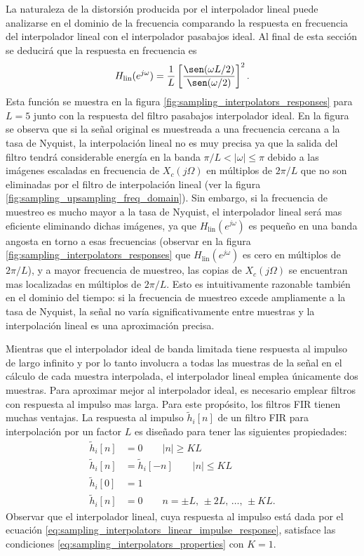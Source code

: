 \documentclass[a4paper]{report}
\begin{document}
La naturaleza de la distorsión producida por el interpolador lineal puede analizarse en el dominio de la frecuencia comparando la respuesta en frecuencia del interpolador lineal con el interpolador pasabajos ideal. Al final de esta sección se deducirá que la respuesta en frecuencia es
\begin{equation}\label{eq:sampling_interpolators_linear_freq_response}
 H_\textrm{lin}(e^{j\omega})=\frac{1}{L}\left[\frac{\sen(\omega L/2)}{\sen(\omega/2)}\right]^2.
\end{equation}
Esta función se muestra en la figura \ref{fig:sampling_interpolators_responses} para \(L=5\) junto con la respuesta del filtro pasabajos interpolador ideal. En la figura se observa que si la señal original es muestreada a una frecuencia cercana a la tasa de Nyquist, la interpolación lineal no es muy precisa ya que la salida del filtro tendrá considerable energía en la banda \(\pi/L<|\omega|\leq\pi\) debido a las imágenes escaladas en frecuencia de \(X_c(j\Omega)\) en múltiplos de \(2\pi/L\) que no son eliminadas por el filtro de interpolación lineal (ver la figura \ref{fig:sampling_upsampling_freq_domain}). Sin embargo, si la frecuencia de muestreo es mucho mayor a la tasa de Nyquist, el interpolador lineal será mas eficiente eliminando dichas imágenes, ya que \(H_\textrm{lin}(e^{j\omega})\) es pequeño en una banda angosta en torno a esas frecuencias (observar en la figura \ref{fig:sampling_interpolators_responses} que \(H_\textrm{lin}(e^{j\omega})\) es cero en múltiplos de \(2\pi/L\)), y a mayor frecuencia de muestreo, las copias de \(X_c(j\Omega)\) se encuentran mas localizadas en múltiplos de \(2\pi/L\). Esto es intuitivamente razonable también en el dominio del tiempo: si la frecuencia de muestreo excede ampliamente a la tasa de Nyquist, la señal no varía significativamente entre muestras y la interpolación lineal es una aproximación precisa.

Mientras que el interpolador ideal de banda limitada tiene respuesta al impulso de largo infinito y por lo tanto involucra a todas las muestras de la señal en el cálculo de cada muestra interpolada, el interpolador lineal emplea únicamente dos muestras. Para aproximar mejor al interpolador ideal, es necesario emplear filtros con respuesta al impulso mas larga. Para este propósito, los filtros FIR tienen muchas ventajas. La respuesta al impulso \(\tilde{h}_i[n]\) de un filtro FIR para interpolación por un factor \(L\) es diseñado para tener las siguientes propiedades:
\begin{equation}\label{eq:sampling_interpolators_properties}
\begin{aligned}
 \tilde{h}_i[n]&=0\qquad|n|\geq KL\\
 \tilde{h}_i[n]&=\tilde{h}_i[-n]\qquad|n|\leq KL\\
 \tilde{h}_i[0]&=1\\
 \tilde{h}_i[n]&=0\qquad n=\pm L,\,\pm 2L,\,\dots,\,\pm KL.
\end{aligned} 
\end{equation}
Observar que el interpolador lineal, cuya respuesta al impulso está dada por el ecuación \ref{eq:sampling_interpolators_linear_impulse_response}, satisface las condiciones \ref{eq:sampling_interpolators_properties} con \(K=1\).
\end{document}
